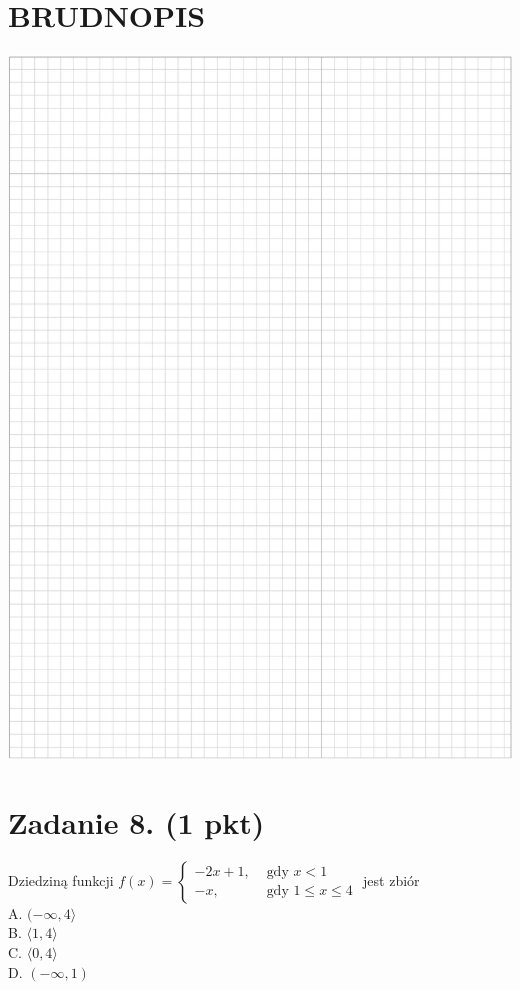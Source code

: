 \documentclass[10pt]{article}
\begin{document}
\section*{BRUDNOPIS}
\begin{center}
\includegraphics[max width=\textwidth]{2024_11_21_3a102e13f4b06a61f46fg-03}
\end{center}

\section*{Zadanie 8. (1 pkt)}
Dziedziną funkcji \(f(x)=\left\{\begin{array}{ll}-2 x+1, & \text { gdy } x<1 \\ -x, & \text { gdy } 1 \leqslant x \leqslant 4\end{array}\right.\) jest zbiór\\
A. \((-\infty, 4\rangle\)\\
B. \(\langle 1,4\rangle\)\\
C. \(\langle 0,4\rangle\)\\
D. \((-\infty, 1)\)
\end{document}
